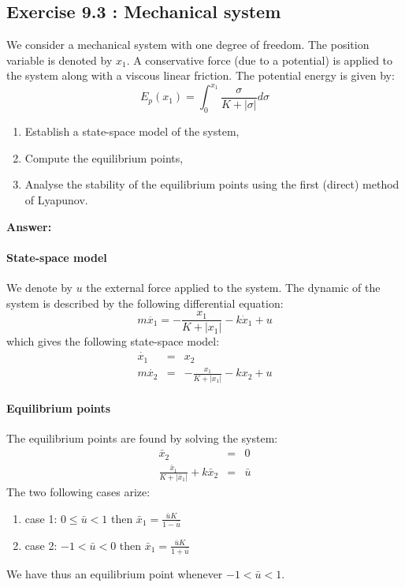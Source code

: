 \subsection*{Exercise 9.3 : Mechanical system}
We consider a mechanical system with one degree of freedom. The position variable is denoted by $x_1$. A conservative force (due to a potential) is applied to the system along with a viscous linear friction. The potential energy is given by:
$$
E_p(x_1)=\int_0^{x_1}\frac{\sigma}{K+|\sigma|}d\sigma
$$
\begin{enumerate}
\item Establish a state-space model of the system,
\item Compute the equilibrium points,
\item Analyse the stability of the equilibrium points using the first (direct) method of Lyapunov.
\end{enumerate}

\textbf{Answer: }~\\

\paragraph{State-space model}
We denote by $u$ the external force applied to the system. The dynamic of the system is described by the following differential equation:
$$
m\ddot{x_1}=-\frac{x_1}{K+|x_1|}-k\dot{x}_1+u
$$
which gives the following state-space model:
$$
\begin{array}{rcl}
\dot{x_1} &=& x_2\\
m\dot{x_2} &=& -\frac{x_1}{K+|x_1|}-kx_2+u
\end{array}
$$

\paragraph{Equilibrium points}
The equilibrium points are found by solving the system:
$$
\begin{array}{rcl}
\bar{x}_2 &=& 0\\
\frac{\bar{x}_1}{K+|\bar{x}_1|}+k\bar{x}_2 &=& \bar{u}
\end{array}
$$
The two following cases arize:
\begin{enumerate}
\item case 1: $0\leq\bar{u}<1$ then $\bar{x}_1=\frac{\bar{u}K}{1-\bar{u}}$
\item case 2: $-1<\bar{u}<0$ then $\bar{x}_1=\frac{\bar{u}K}{1+\bar{u}}$
\end{enumerate}
We have thus an equilibrium point whenever $-1<\bar{u}<1$.

